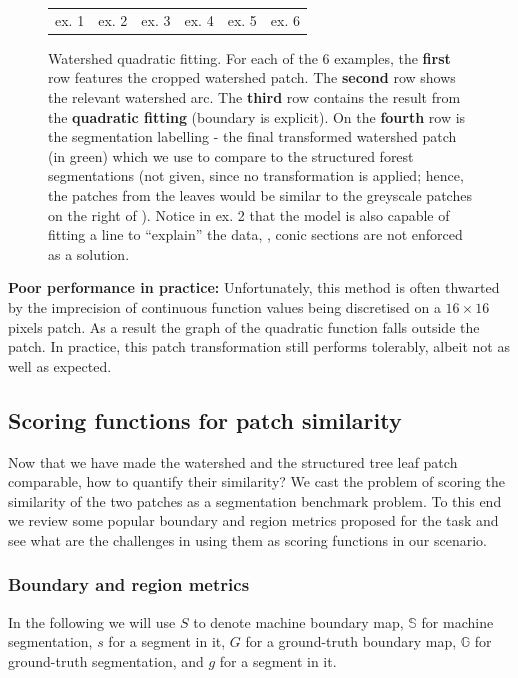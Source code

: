 \begin{figure}[t]
\begin{center}
\begin{tabular}{ c c c c c c }
  ex. 1 & ex. 2 & ex. 3 & ex. 4 & ex. 5 & ex. 6 \\
  \end{tabular}
\end{center}
\caption[Watershed quadratic fitting]{Watershed quadratic fitting. For each of the 6 examples, the {\bf first} row features the cropped watershed patch. The {\bf second} row shows the relevant watershed arc. The {\bf third} row contains the result from the {\bf quadratic fitting} (boundary is explicit). On the {\bf fourth} row is the segmentation labelling - the final transformed watershed patch (in green) which we use to compare to the structured forest segmentations (not given, since no transformation is applied; hence, the patches from the leaves would be similar to the greyscale patches on the right of ). Notice in ex. 2 that the model is also capable of fitting a line to ``explain'' the data, \ie, conic sections are not enforced as a solution.}
\label{fig:ws-quadratic-fitting}
\end{figure}

\textbf{Poor performance in practice:} Unfortunately, this method is often thwarted by the imprecision of continuous function values being discretised on a $16\times 16$ pixels patch. %
As a result the graph of the quadratic function falls outside the patch. In practice, this patch transformation still performs tolerably, %
albeit not as well as expected.

\subsection{Scoring functions for patch similarity}
Now that we have made the watershed and the structured tree leaf patch comparable, how to quantify their similarity? 
We cast the problem of scoring the similarity of the two patches as a segmentation benchmark problem. To this end we review some popular boundary and region metrics proposed for the task and see what are the challenges in using them as scoring functions in our scenario.

\subsubsection{Boundary and region metrics}
\label{sec:ch4-boundary-and-region-metrics-maths}
In the following we will use $S$ to denote machine boundary map, $\mathbb{S}$ for machine segmentation, $s$ for a segment in it, $G$ for a ground-truth boundary map, $\mathbb{G}$ for ground-truth segmentation, and $g$ for a segment in it.

